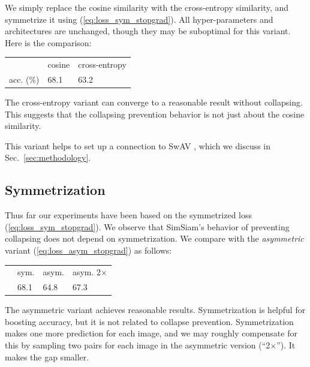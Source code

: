 \documentclass[final]{cvpr}
\newcommand{\tablestyle}[2]{\setlength{\tabcolsep}{#1}\renewcommand{\arraystretch}{#2}\centering\footnotesize}
\begin{document}
We simply replace the cosine similarity with the cross-entropy similarity, and symmetrize it using (\ref{eq:loss_sym_stopgrad}).
All hyper-parameters and architectures are unchanged, though they may be suboptimal for this variant. Here is the comparison:
\begin{center}
\vspace{-.2em}
\small
\tablestyle{2pt}{1.1}
\begin{tabular}{x{48} | x{48} x{48}}
& cosine & cross-entropy \\
\shline
acc. (\%) & 68.1 & 63.2 \\
\end{tabular}
\vspace{-.2em}
\end{center}
The cross-entropy variant can converge to a reasonable result without collapsing. This suggests that the collapsing prevention behavior is not just about the cosine similarity.

This variant helps to set up a connection to SwAV \cite{Caron2020}, which we discuss in Sec.~\ref{sec:methodology}.

\subsection{Symmetrization} \label{subsec:symm}

Thus far our experiments have been based on the symmetrized loss (\ref{eq:loss_sym_stopgrad}). We observe that SimSiam's behavior of preventing collapsing does not depend on symmetrization.
We compare with the \emph{asymmetric} variant (\ref{eq:loss_asym_stopgrad}) as follows:
\begin{center}
\vspace{-.2em}
\small
\tablestyle{2pt}{1.1}
\begin{tabular}{x{48} | x{48}x{48}x{48}}
 & sym. & asym. & asym. 2$\times$ \\
\shline
{} & 68.1 & 64.8 & 67.3  \\
\end{tabular}
\vspace{-.2em}
\end{center}
The asymmetric variant achieves reasonable results.
Symmetrization is helpful for boosting accuracy, but it is not related to collapse prevention. Symmetrization makes one more prediction for each image, and we may roughly compensate for this by sampling two pairs for each image in the asymmetric version (``2$\times$''). It makes the gap smaller.
\end{document}
